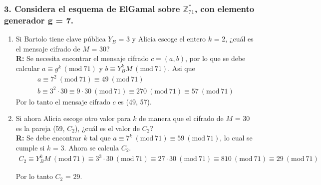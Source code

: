 \documentclass[14pt]{article}
\newcommand{\Mod}[1]{\ (\mathrm{mod}\ #1)}
\begin{document}
\subsubsection*{3. Considera el esquema de ElGamal sobre $\mathbb{Z}^*_{71}$, con elemento generador g = 7.}
\begin{enumerate}[label=\alph*)]
\item Si Bartolo tiene clave pública $Y_B$ = 3 y Alicia escoge el entero $k$ = 2, ¿cuál es el mensaje cifrado de $M$ = 30? \\
  
    \textbf{R:}  Se necesita encontrar el mensaje cifrado $c = (a, b)$, por lo que se debe calcular $a \equiv g^k \Mod{71}$ y $b \equiv Y_B^kM \Mod{71}$. Asi que
  \begin{gather*}
    a \equiv 7^2 \Mod{71} \equiv 49 \Mod{71} \\
    b \equiv 3^2 \cdot 30 \equiv 9 \cdot 30 \Mod{71} \equiv 270 \Mod{71} \equiv 57 \Mod{71}
  \end{gather*}
  Por lo tanto el mensaje cifrado $c$ es (49, 57). \\

  
\item Si ahora Alicia escoge otro valor para $k$ de manera que el cifrado de $M$ = 30 es la pareja (59, $C_2$), ¿cuál es el valor de $C_2$? \\
  
    \textbf{R:}  Se debe encontrar $k$ tal que $a \equiv 7^k \Mod{71} \equiv 59 \Mod{71}$, lo cual se cumple si $k$ = 3. Ahora se calcula $C_2$.
  \begin{gather*}
    C_2 \equiv Y_B^kM \Mod{71} \equiv 3^3 \cdot 30 \Mod{71} \equiv 27 \cdot 30 \Mod{71} \equiv 810 \Mod{71} \equiv 29 \Mod{71}
  \end{gather*}

  Por lo tanto $C_2$ = 29.
  
\end{enumerate}
\end{document}
